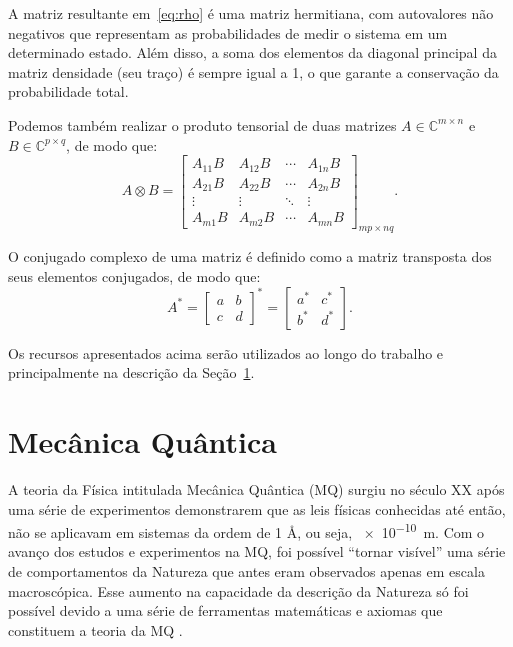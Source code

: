 A matriz resultante em~\eqref{eq:rho} é uma matriz hermitiana, com autovalores não negativos que representam as probabilidades de medir o sistema em um determinado estado. Além disso, a soma dos elementos da diagonal principal da matriz densidade (seu traço) é sempre igual a 1, o que garante a conservação da probabilidade total.

Podemos também realizar o produto tensorial de duas matrizes \(A\in\mathbb{C}^{m{\times}n}\) e \(B\in\mathbb{C}^{p{\times}q}\), de modo que:
\begin{equation}\label{eq:tensormatrix}
  A \otimes B = \begin{bmatrix}
                  A_{11} B  & A_{12} B  & \cdots & A_{1 n} B \\
                  A_{21} B  & A_{22} B  & \cdots & A_{2 n} B \\
                  \vdots    & \vdots    & \ddots & \vdots    \\
                  A_{m 1} B & A_{m 2} B & \cdots & A_{m n} B
                \end{bmatrix}_{m p \times n q}.
              \end{equation}

O conjugado complexo de uma matriz é definido como a matriz transposta dos seus elementos conjugados, de modo que:
\begin{equation}\label{eq:conjugadomatrix}
  A^{\!*} = \begin{bmatrix}
                a & b \\
                c & d
          \end{bmatrix}^{\!*} =
          \begin{bmatrix}
            a^{*} & c^{*} \\
            b^{*} & d^{*}
          \end{bmatrix}.
      \end{equation}

Os recursos apresentados acima serão utilizados ao longo do trabalho e principalmente na descrição da Seção~\ref{sec:Mecanicaquantica}.

\section{Mecânica Quântica}\label{sec:Mecanicaquantica}

A teoria da Física intitulada Mecânica Quântica (MQ) surgiu no século XX após uma série de experimentos demonstrarem que as leis físicas conhecidas até então, não se aplicavam em sistemas da ordem de 1 \AA, ou seja, \SI{e-10}{\meter}. Com o avanço dos estudos e experimentos na MQ, foi possível ``tornar visível'' uma série de comportamentos da Natureza que antes eram observados apenas em escala macroscópica. Esse aumento na capacidade da descrição da Natureza só foi possível devido a uma série de ferramentas matemáticas e axiomas que constituem a teoria da MQ \cite{jorcuvich}.

